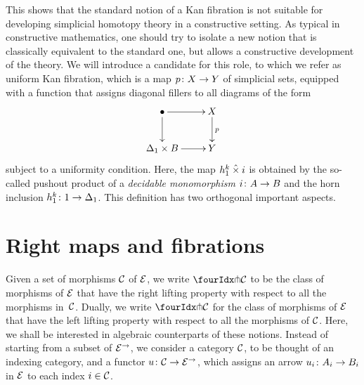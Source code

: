 \documentclass[reqno,10pt,a4paper,oneside]{amsart}
\begin{document}
This shows that the standard notion of a Kan fibration is not suitable for developing simplicial homotopy theory in a constructive setting. As typical
in constructive mathematics, one should try to isolate a new notion that is classically equivalent to the standard one, but allows a constructive development of the theory. We will introduce a candidate for this role, to which we
refer as uniform Kan fibration, which is a 
map $p \co X \to Y$ of simplicial sets, equipped with a function that assigns diagonal fillers to all diagrams of the form
\[
\xymatrix{
\bullet \ar[r] \ar[d] & X \ar[d]^p \\
\Delta_1 \times B \ar[r] & Y}
\]
subject to a uniformity condition. Here, the map $h^k_1 \hattimes i$ is obtained by the so-called pushout product of a \emph{decidable monomorphism}
$i \co A \to B$ and the horn inclusion $h^k_1 \co 1 \to \Delta_1$. This definition has two orthogonal important aspects. 

\newpage


\section{Right maps and fibrations}
\label{sec-orthog-functors}


 Given a set of morphisms $\cal{C}$ of $\catE$, we 
write $\liftr{\cal{C}}$ to be the class of morphisms of $\catE$ that have 
the right lifting property with respect to all the morphisms in~$\cal{C}$. Dually, we write $\liftl{\cal{C}}$ for the class of morphisms of $\catE$ that have the left lifting property with respect to all the morphisms of $\cal{C}$. 
Here, we shall be interested in algebraic counterparts of these notions. Instead of starting from a subset of $\catE^\to$, we consider a category $\cal{C}$, to be thought of an indexing category, and a functor $u \co \cal{C} \to \catE^\to$, which assigns an arrow $u_i \co A_i \to B_i$ in $\catE$ to each index $i \in \cal{C}$.
\end{document}

